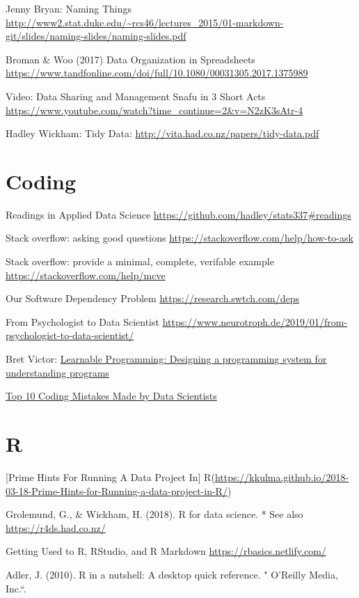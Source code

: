 \documentclass[]{book}
\begin{document}
Jenny Bryan: Naming Things
\url{http://www2.stat.duke.edu/~rcs46/lectures_2015/01-markdown-git/slides/naming-slides/naming-slides.pdf}

Broman \& Woo (2017) Data Organization in Spreadsheets
\url{https://www.tandfonline.com/doi/full/10.1080/00031305.2017.1375989}

Video: Data Sharing and Management Snafu in 3 Short Acts
\url{https://www.youtube.com/watch?time_continue=2\&v=N2zK3sAtr-4}

Hadley Wickham: Tidy Data:
\url{http://vita.had.co.nz/papers/tidy-data.pdf}

\section{Coding}\label{coding}

Readings in Applied Data Science
\url{https://github.com/hadley/stats337\#readings}

Stack overflow: asking good questions
\url{https://stackoverflow.com/help/how-to-ask}

Stack overflow: provide a minimal, complete, verifable example
\url{https://stackoverflow.com/help/mcve}

Our Software Dependency Problem \url{https://research.swtch.com/deps}

From Psychologist to Data Scientist
\url{https://www.neurotroph.de/2019/01/from-psychologist-to-data-scientist/}

Bret Victor:
\href{http://worrydream.com/LearnableProgramming/}{Learnable
Programming: Designing a programming system for understanding programs}

\href{https://www.kdnuggets.com/2019/04/top-10-coding-mistakes-data-scientists.html}{Top
10 Coding Mistakes Made by Data Scientists}

\section{R}\label{r}

{[}Prime Hints For Running A Data Project In{]}
R(\url{https://kkulma.github.io/2018-03-18-Prime-Hints-for-Running-a-data-project-in-R/})

Grolemund, G., \& Wickham, H. (2018). R for data science. * See also
\url{https://r4ds.had.co.nz/}

Getting Used to R, RStudio, and R Markdown
\url{https://rbasics.netlify.com/}

Adler, J. (2010). R in a nutshell: A desktop quick reference. " O'Reilly
Media, Inc.``.
\end{document}
